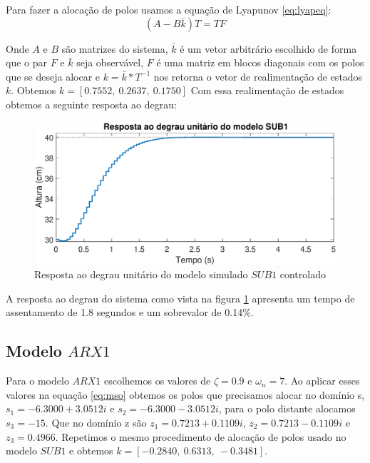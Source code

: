 Para fazer a alocação de polos usamos a equação de Lyapunov
\eqref{eq:lyapeq}:
\begin{equation}\label{eq:lyapeq}
(A-B\bar{k})T=TF
\end{equation}

Onde $A$ e $B$ são matrizes do sistema, $\bar{k}$ é um vetor arbitrário escolhido de forma que o par $F$ e $\bar{k}$ seja observável, $F$ é uma matriz em blocos diagonais com os polos que se deseja alocar e $k=\bar{k}*T^{-1}$ nos retorna o vetor de realimentação de estados $k$. Obtemos $k=[0.7552,~0.2637,~0.1750]$ Com essa realimentação de estados obtemos a seguinte resposta ao degrau:

\begin{figure}[H]
	\centering
	\includegraphics[width=1\linewidth]{respostadegrausub1c}
	\caption[Resposta ao degrau unitário do modelo $SUB1$ controlado]{Resposta ao degrau unitário do modelo simulado $SUB1$ controlado}
	\label{fig:respostadegrausub1c}
\end{figure}


A resposta ao degrau do sistema como vista na figura \ref{fig:respostadegrausub1c} apresenta um tempo de assentamento de 1.8 segundos e um sobrevalor de 0.14\%.

\subsection{Modelo $ARX1$}

Para o modelo $ARX1$ escolhemos os valores de $\zeta=0.9$ e $\omega_n=7$. Ao aplicar esses valores na equação \eqref{eq:mso} obtemos os polos que precisamos alocar no domínio s, $s_1=-6.3000 + 3.0512i$ e $s_2=-6.3000 - 3.0512i$, para o polo distante alocamos $s_3=-15$. Que no domínio z são $z_1=0.7213 + 0.1109i$, $z_2=0.7213 - 0.1109i$ e $z_3=0.4966$. Repetimos o mesmo procedimento de alocação de polos usado no modelo $SUB1$ e obtemos $k=[-0.2840,~0.6313,~-0.3481]$.


